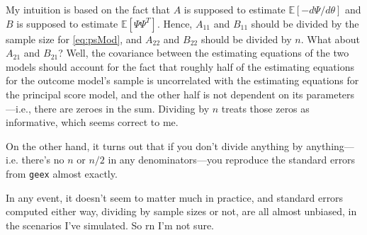 \documentclass[11pt]{article} %
\begin{document}
My intuition is based on the fact that $A$ is supposed to estimate $\mathbb{E}[-d\Psi/d\theta]$ and $B$ is supposed to estimate $\mathbb{E}[\Psi\Psi^T]$.
Hence, $A_{11}$ and $B_{11}$ should be divided by the sample size for \eqref{eq:psMod}, and $A_{22}$ and $B_{22}$ should be divided by $n$.
What about $A_{21}$ and $B_{21}$? Well, the covariance between the estimating equations of the two models should account for the fact that roughly half of the estimating equations for the outcome model's sample is uncorrelated with the estimating equations for the principal score model, and the other half is not dependent on its parameters---i.e., there are zeroes in the sum. Dividing by $n$ treats those zeros as informative, which seems correct to me.

On the other hand, it turns out that if you don't divide anything by anything---i.e. there's no $n$ or $n/2$ in any denominators---you reproduce the standard errors from \texttt{geex} almost exactly.

In any event, it doesn't seem to matter much in practice, and standard errors computed either way, dividing by sample sizes or not, are all almost unbiased, in the scenarios I've simulated. So rn I'm not sure.
\end{document}
